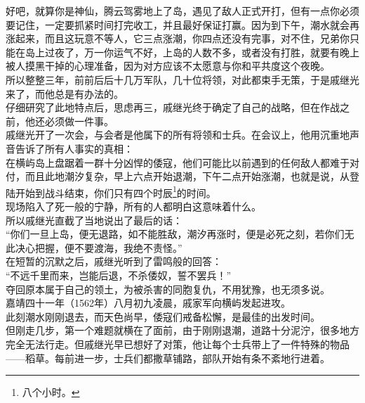 \begin{multicols}{\theparacolNo}
好吧，就算你是神仙，腾云驾雾地上了岛，遇见了敌人正式开打，但有一点你必须要记住，一定要抓紧时间打完收工，并且最好保证打赢。因为到下午，潮水就会再涨起来，而且这玩意不等人，它三点涨潮，你四点还没有完事，对不住，兄弟你只能在岛上过夜了，万一你运气不好，上岛的人数不多，或者没有打胜，就要有晚上被人摸黑干掉的心理准备，因为对方应该不太愿意与你和平共度这个夜晚。\\

所以整整三年，前前后后十几万军队，几十位将领，对此都束手无策，于是戚继光来了，而他总是有办法的。\\

仔细研究了此地特点后，思虑再三，戚继光终于确定了自己的战略，但在作战之前，他还必须做一件事。\\

戚继光开了一次会，与会者是他属下的所有将领和士兵。在会议上，他用沉重地声音告诉了所有人事实的真相：\\

在横屿岛上盘踞着一群十分凶悍的倭寇，他们可能比以前遇到的任何敌人都难于对付，而且此地潮汐复杂，早上六点开始退潮，下午二点开始涨潮，也就是说，从登陆开始到战斗结束，你们只有四个时辰\footnote{八个小时。}的时间。\\

现场陷入了死一般的宁静，所有的人都明白这意味着什么。\\

所以戚继光直截了当地说出了最后的话：\\

“你们一旦上岛，便无退路，如不能胜敌，潮汐再涨时，便是必死之刻，若你们无此决心把握，便不要渡海，我绝不责怪。”\\

在短暂的沉默之后，戚继光听到了雷鸣般的回答：\\

“不远千里而来，岂能后退，不杀倭奴，誓不罢兵！”\\

夺回原本属于自己的领土，为被杀害的同胞复仇，不用犹豫，也无须多说。\\

嘉靖四十一年（1562年）八月初九凌晨，戚家军向横屿发起进攻。\\

此刻潮水刚刚退去，而天色尚早，倭寇们戒备松懈，是最佳的出发时间。\\

但刚走几步，第一个难题就横在了面前，由于刚刚退潮，道路十分泥泞，很多地方完全无法行走。但戚继光早已想好了对策，他让每个士兵带上了一件特殊的物品——稻草。每前进一步，士兵们都撒草铺路，部队开始有条不紊地行进着。\\


\end{multicols}
